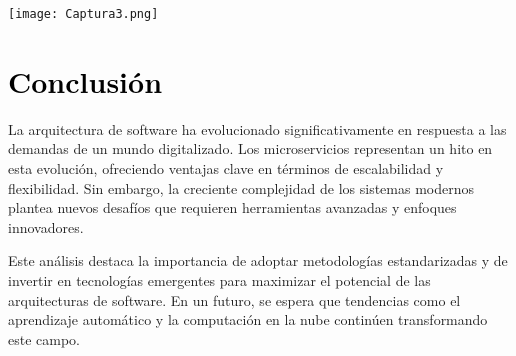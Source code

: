 \documentclass[12pt,a4paper]{article}
\begin{document}
\begin{multicols}{2}
\texttt{[image: Captura3.png]}


\section{\textcolor{black}{Conclusión}}
La arquitectura de software ha evolucionado significativamente en respuesta a las demandas de un mundo digitalizado. Los microservicios representan un hito en esta evolución, ofreciendo ventajas clave en términos de escalabilidad y flexibilidad. Sin embargo, la creciente complejidad de los sistemas modernos plantea nuevos desafíos que requieren herramientas avanzadas y enfoques innovadores.

Este análisis destaca la importancia de adoptar metodologías estandarizadas y de invertir en tecnologías emergentes para maximizar el potencial de las arquitecturas de software. En un futuro, se espera que tendencias como el aprendizaje automático y la computación en la nube continúen transformando este campo.


\end{multicols}
\end{document}
